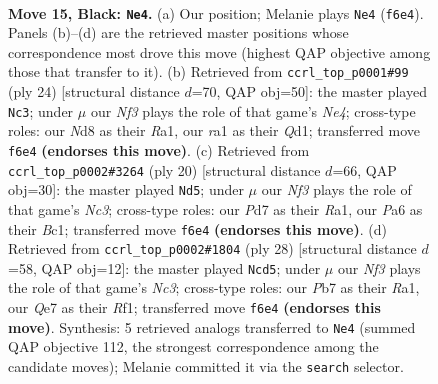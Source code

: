 \documentclass[11pt]{article}
\begin{document}
\clearpage

\begin{figure}[p]\centering
\begin{subfigure}{0.46\textwidth}\centering
\resizebox{\linewidth}{!}{%
\newchessgame
\chessboard[
  setfen={r1bnrk2/1pppqppp/p4n2/3P4/8/2B1PNP1/PP3PBP/R2Q1R1K b - - 6 15},
  showmover=false,
  pgfstyle=straightmove, color=movearrow, markmove={f6-e4}
]}
\caption{}
\end{subfigure}\hfill
\begin{subfigure}{0.46\textwidth}\centering
\resizebox{\linewidth}{!}{%
\newchessgame
\chessboard[
  setfen={rn1q1rk1/pb2bpp1/1p1pp2p/8/2PPN3/3B1N2/PP3PPP/R2QR1K1 w - - 2 13},
  showmover=false,
  pgfstyle=straightmove, color=movearrow, markmove={e4-c3}
]}
\caption{}
\end{subfigure}
\\[4pt]
\begin{subfigure}{0.46\textwidth}\centering
\resizebox{\linewidth}{!}{%
\newchessgame
\chessboard[
  setfen={r1bq1rk1/1pp2pbp/p1np2p1/8/4P3/2NQ1N2/PPP2PPP/R1B2RK1 w - - 0 11},
  showmover=false,
  pgfstyle=straightmove, color=movearrow, markmove={c3-d5}
]}
\caption{}
\end{subfigure}\hfill
\begin{subfigure}{0.46\textwidth}\centering
\resizebox{\linewidth}{!}{%
\newchessgame
\chessboard[
  setfen={r2q1rk1/4bpp1/p2pbn1p/4p3/Pp2P3/2NQN3/1PPB1PPP/R4RK1 w - - 0 15},
  showmover=false,
  pgfstyle=straightmove, color=movearrow, markmove={c3-d5}
]}
\caption{}
\end{subfigure}
\caption{\textbf{Move 15, Black: \texttt{Ne4}.} (a) Our position; Melanie plays \texttt{Ne4} (\texttt{f6e4}). Panels (b)--(d) are the retrieved master positions whose correspondence most drove this move (highest QAP objective among those that transfer to it). (b) Retrieved from \texttt{ccrl\_top\_p0001\#99} (ply 24) [structural distance $d$=70, QAP obj=50]: the master played \texttt{Nc3}; under $\mu$ our \emph{Nf3} plays the role of that game's \emph{Ne4}; cross-type roles: our \emph{N}d8 as their \emph{R}a1, our \emph{r}a1 as their \emph{Q}d1; transferred move \texttt{f6e4} \textbf{(endorses this move)}. (c) Retrieved from \texttt{ccrl\_top\_p0002\#3264} (ply 20) [structural distance $d$=66, QAP obj=30]: the master played \texttt{Nd5}; under $\mu$ our \emph{Nf3} plays the role of that game's \emph{Nc3}; cross-type roles: our \emph{P}d7 as their \emph{R}a1, our \emph{P}a6 as their \emph{B}c1; transferred move \texttt{f6e4} \textbf{(endorses this move)}. (d) Retrieved from \texttt{ccrl\_top\_p0002\#1804} (ply 28) [structural distance $d$=58, QAP obj=12]: the master played \texttt{Ncd5}; under $\mu$ our \emph{Nf3} plays the role of that game's \emph{Nc3}; cross-type roles: our \emph{P}b7 as their \emph{R}a1, our \emph{Q}e7 as their \emph{R}f1; transferred move \texttt{f6e4} \textbf{(endorses this move)}. Synthesis: 5 retrieved analogs transferred to \texttt{Ne4} (summed QAP objective 112, the strongest correspondence among the candidate moves); Melanie committed it via the \texttt{search} selector.}
\label{fig:thought-m29}
\end{figure}
\end{document}
